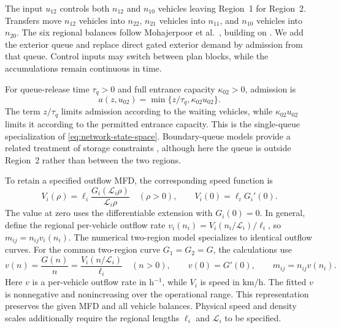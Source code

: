\documentclass[preprint,12pt]{elsarticle}
\theoremstyle{definition}
\theoremstyle{plain}
\theoremstyle{definition}
\theoremstyle{plain}
\begin{document}
The input $u_{12}$ controls both $n_{12}$ and $n_{10}$ vehicles leaving
Region~1 for Region~2. Transfers move $n_{12}$ vehicles into $n_{22}$,
$n_{21}$ vehicles into $n_{11}$, and $n_{10}$ vehicles into $n_{20}$.
The six regional balances follow Mohajerpoor et al.~\cite{mohajerpoor2020hinf},
building on \cite{geroliminis2013mpc,zhong2018robust}. We add the exterior
queue and replace direct gated exterior demand by admission from that
queue. Control inputs may switch between plan blocks, while the
accumulations remain continuous in time.

For queue-release time $\tau_q>0$ and full entrance capacity
$\kappa_{02}>0$, admission is
\begin{equation}
 a(z,u_{02})=\min\{z/\tau_q,\kappa_{02}u_{02}\}.
 \label{eq:new-admission}
\end{equation}
The term $z/\tau_q$ limits admission according to the waiting vehicles,
while $\kappa_{02}u_{02}$ limits it according to the permitted entrance
capacity. This is the single-queue specialization of
\eqref{eq:network-state-space}. Boundary-queue models provide a related
treatment of storage constraints \cite{haddad2017queues}, although here
the queue is outside Region~2 rather than between the two regions.

To retain a specified outflow MFD, the corresponding speed function is
\begin{equation}
 V_i(\rho)=\ell_i\frac{G_i(\mathcal L_i\rho)}{\mathcal L_i\rho}
 \quad(\rho>0),\qquad V_i(0)=\ell_i G_i'(0).
 \label{eq:speed-from-mfd}
\end{equation}
The value at zero uses the differentiable extension with $G_i(0)=0$.
In general, define the regional per-vehicle outflow rate
$v_i(n_i)=V_i(n_i/\mathcal L_i)/\ell_i$, so $m_{ij}=n_{ij}v_i(n_i)$.
The numerical two-region model specializes to identical outflow curves.
For the common two-region curve $G_1=G_2=G$, the calculations use
\begin{equation}
 v(n)=\frac{G(n)}{n}=\frac{V_i(n/\mathcal L_i)}{\ell_i}
 \quad(n>0),\qquad v(0)=G'(0),\qquad m_{ij}=n_{ij}v(n_i).
 \label{eq:per-vehicle-outflow-rate}
\end{equation}
Here $v$ is a per-vehicle outflow rate in h$^{-1}$, while $V_i$ is speed
in km/h. The fitted $v$ is nonnegative and nonincreasing over the
operational range. This representation preserves the given MFD and all
vehicle balances. Physical speed and density scales additionally require
the regional lengths $\ell_i$ and $\mathcal L_i$ to be specified.
\end{document}
